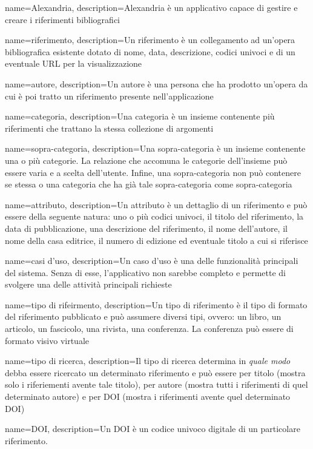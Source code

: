 
{
    name={Alexandria},
    description={Alexandria è un applicativo capace di gestire e creare i riferimenti bibliografici}
}

{
    name={riferimento},
    description={Un riferimento è un collegamento ad un'opera bibliografica esistente dotato di nome, data, descrizione, codici univoci e di un eventuale URL per la visualizzazione}
}

{
    name={autore},
    description={Un autore è una persona che ha prodotto un'opera da cui è poi tratto un riferimento presente nell'applicazione}
}

{
    name={categoria},
    description={Una categoria è un insieme contenente più riferimenti che trattano la stessa collezione di argomenti}
}

{
    name={sopra-categoria},
    description={Una sopra-categoria è un insieme contenente una o più categorie. La relazione che accomuna le categorie dell'insieme può essere varia e a scelta dell'utente. Infine, una sopra-categoria non può contenere se stessa o una categoria che ha già tale sopra-categoria come sopra-categoria}
}

{
    name={attributo},
    description={Un attributo è un dettaglio di un riferimento e può essere della seguente natura: uno o più codici univoci, il titolo del riferimento, la data di pubblicazione, una descrizione del riferimento, il nome dell'autore, il nome della casa editrice, il numero di edizione ed eventuale titolo a cui si riferisce}
}

{
    name={casi d'uso},
    description={Un caso d'uso è una delle funzionalità principali del sistema. Senza di esse, l'applicativo non sarebbe completo e permette di svolgere una delle attività principali richieste}
}

{
    name={tipo di rifeirmento},
    description={Un tipo di riferimento è il tipo di formato del riferimento pubblicato e può assumere diversi tipi, ovvero: un libro, un articolo, un fascicolo, una rivista, una conferenza. La conferenza può essere di formato visivo virtuale}
}

{
    name={tipo di ricerca},
    description={Il tipo di ricerca determina in \textit{quale modo} debba essere ricercato un determinato riferimento e può essere per titolo (mostra solo i riferiementi avente tale titolo), per autore (mostra tutti i riferimenti di quel determinato autore) e per DOI (mostra i riferimenti avente quel determinato DOI)}
}

{
    name={DOI},
    description={Un DOI è un codice univoco digitale di un particolare riferimento.}
}


\printglossaries

